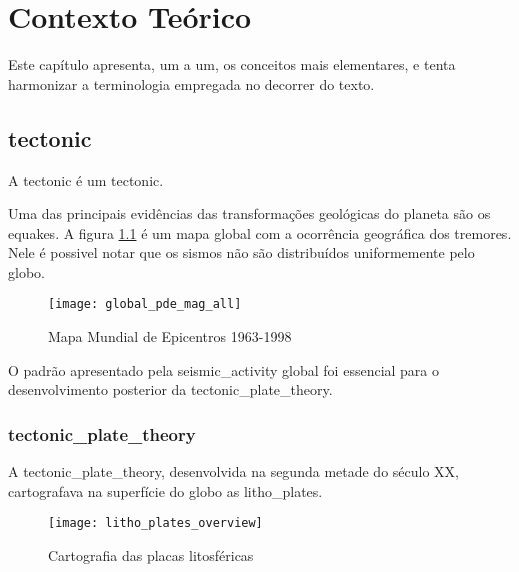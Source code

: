 \chapter{Contexto Teórico}
\label{cap:conceitos}

Este capítulo apresenta, um a um, os conceitos mais elementares, 
e tenta harmonizar a terminologia empregada no decorrer do texto.


\section{\Gls{tectonic}}
\label{sec:02_tectonica}

A \gls{tectonic} é um \glsdesc*{tectonic}.

Uma das principais evidências das transformações geológicas do planeta 
são os \glspl{equake}. A figura \ref{f:global_epicenters} \citep{img_world_epicenters}
é um mapa global com a ocorrência geográfica dos tremores. Nele é possivel notar que 
os sismos não são distribuídos uniformemente pelo globo.

\begin{figure}[H]
   \centering
   \texttt{[image: global\_pde\_mag\_all]}
   \caption[Mapa Mundial de Epicentros 1963-1998]
   		   {Mapa Mundial de Epicentros 1963-1998\footnotemark} 
   \label{f:global_epicenters}
\end{figure} 
 
O padrão apresentado pela \gls{seismic_activity} global foi essencial 
para o desenvolvimento posterior da \gls*{tectonic_plate_theory}.

\subsection{\Gls{tectonic_plate_theory}}
\label{sec:02_placas}

A \gls*{tectonic_plate_theory}, desenvolvida na segunda metade do século XX,
cartografava na superfície do globo as \glspl{litho_plate}.


\begin{figure}[H]
   \centering
   \texttt{[image: litho\_plates\_overview]}
   \caption[Cartografia das placas litosféricas]
   		   {Cartografia das placas litosféricas\footnotemark} 
   \label{f:plates_overview}
\end{figure} 
 

